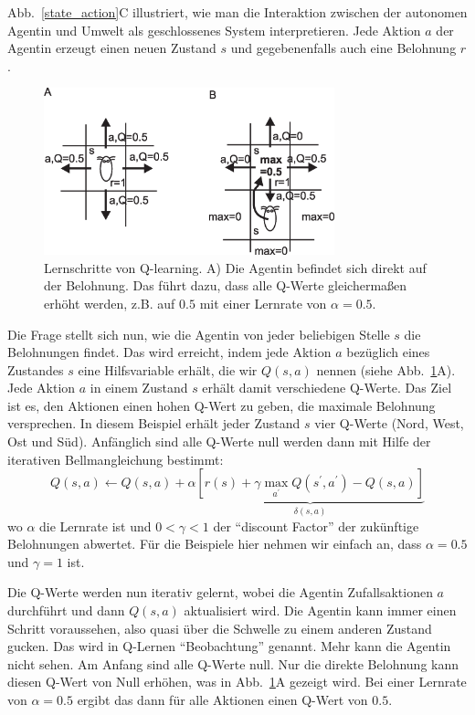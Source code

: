 \documentclass[12pt]{article}
\begin{document}
Abb.~\ref{state_action}C illustriert, wie man die Interaktion zwischen
der autonomen Agentin und Umwelt als geschlossenes System interpretieren. Jede
Aktion $a$ der Agentin erzeugt einen neuen Zustand $s$ und
gegebenenfalls auch eine Belohnung $r$.

\begin{figure}[!hbt]
\begin{center}
\mbox{\includegraphics[width=0.75\textwidth]{learning_steps}}
\end{center}
\caption{Lernschritte von Q-learning. A) Die Agentin befindet
  sich direkt auf der Belohnung. Das führt dazu, dass alle
  Q-Werte gleichermaßen erhöht werden, z.B. auf $0.5$ mit
  einer Lernrate von $\alpha = 0.5$.
\label{learning_steps}}
\end{figure}

Die Frage stellt sich nun, wie die Agentin von jeder beliebigen Stelle
$s$ die Belohnungen findet. Das wird erreicht, indem jede Aktion $a$
bezüglich eines Zustandes $s$ eine Hilfsvariable erhält, die wir
$Q(s,a)$ nennen (siehe Abb.~\ref{learning_steps}A). Jede Aktion $a$ in einem
Zustand $s$ erhält damit verschiedene Q-Werte. Das Ziel ist es, den Aktionen
einen hohen Q-Wert zu geben, die maximale Belohnung versprechen. In diesem
Beispiel erhält jeder Zustand $s$ vier Q-Werte (Nord, West, Ost
und Süd). Anfänglich sind alle Q-Werte null werden dann mit Hilfe der iterativen Bellmangleichung bestimmt:
\begin{equation}
  Q(s,a) \leftarrow Q(s,a) + \alpha \underbrace{\left[ r(s) + \gamma \max_{a^\prime} Q(s^\prime,a^\prime) - Q(s,a) \right]}_{\delta(s,a)}
  \label{bellit}
\end{equation}
wo $\alpha$ die Lernrate ist und $0 < \gamma < 1$ der ``discount
Factor'' der zukünftige Belohnungen abwertet. Für die Beispiele hier
nehmen wir einfach an, dass $\alpha = 0.5$ und $\gamma = 1$ ist.

Die Q-Werte werden nun iterativ gelernt, wobei die Agentin
Zufallsaktionen $a$ durchführt und dann $Q(s,a)$ aktualisiert
wird. Die Agentin kann immer einen Schritt voraussehen, also quasi
über die Schwelle zu einem anderen Zustand gucken. Das wird in Q-Lernen
``Beobachtung'' genannt. Mehr kann die Agentin nicht sehen. Am Anfang
sind alle Q-Werte null. Nur die direkte Belohnung kann diesen Q-Wert von Null
erhöhen, was in Abb.~\ref{learning_steps}A gezeigt wird. Bei einer
Lernrate von $\alpha = 0.5$ ergibt das dann für alle Aktionen einen
Q-Wert von $0.5$.
\end{document}
